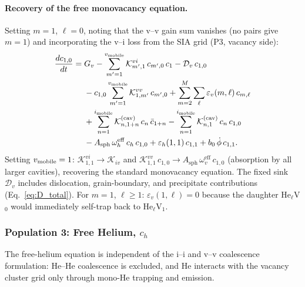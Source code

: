 \documentclass[pdflatex,sn-basic]{sn-jnl} %
\begin{document}
\paragraph{Recovery of the free monovacancy equation.}
Setting $m = 1$, $\ell = 0$, noting that the v--v gain sum vanishes
(no pairs give $m=1$) and incorporating the v--i loss from the SIA
grid (P3, vacancy side):
\begin{equation}\label{eq:ME_V1}
\begin{split}
\frac{dc_{1,0}}{dt} = {} &
  G_v
  - \sum_{m'=1}^{v_{\rm mobile}}\mathcal{K}_{m',1}^{vi}\,c_{m',0}\,c_1
  - \mathcal{D}_v\,c_{1,0}
  \\
  &- c_{1,0}\sum_{m'=1}^{v_{\rm mobile}}\mathcal{K}_{1,m'}^{vv}\,c_{m',0}
  + \sum_{m=2}^{M}\sum_\ell\varepsilon_v(m,\ell)\,c_{m,\ell}
  \\
  &+ \sum_{n=1}^{i_{\rm mobile}}
     \mathcal{K}_{n,1+n}^{(\mathrm{cav})}\,c_n\,\bar{c}_{1+n}
   - \sum_{n=1}^{i_{\rm mobile}}
     \mathcal{K}_{n,1}^{(\mathrm{cav})}\,c_n\,c_{1,0}
  \\
  &- A_{\mathrm{sph}}\,\omega_h^{\mathrm{eff}}\,c_h\,c_{1,0}
   + \varepsilon_h(1,1)\,c_{1,1}
   + b_0\,\dot{\phi}\,c_{1,1}.
\end{split}
\end{equation}
Setting $v_{\rm mobile} = 1$: $\mathcal{K}_{1,1}^{vi} \to \mathcal{K}_{iv}$
and $\mathcal{K}_{1,1}^{vv}\,c_{1,0} \to A_{\mathrm{sph}}\,\omega_v^{\mathrm{eff}}
\,c_{1,0}$ (absorption by all larger cavities), recovering the standard
monovacancy equation. The fixed sink $\mathcal{D}_v$ includes dislocation,
grain-boundary, and precipitate contributions (Eq.~\ref{eq:D_total}). For
$m=1$, $\ell \geq 1$: $\varepsilon_v(1,\ell) = 0$ because the daughter
He$_\ell$V$_0$ would immediately self-trap back to He$_\ell$V$_1$.


\subsubsection{Population 3: Free Helium, $c_h$}
\label{sec:ME_He}

The free-helium equation is independent of the i--i and v--v coalescence
formulation: He--He coalescence is excluded, and He interacts with the
vacancy cluster grid only through mono-He trapping and emission.
\end{document}

